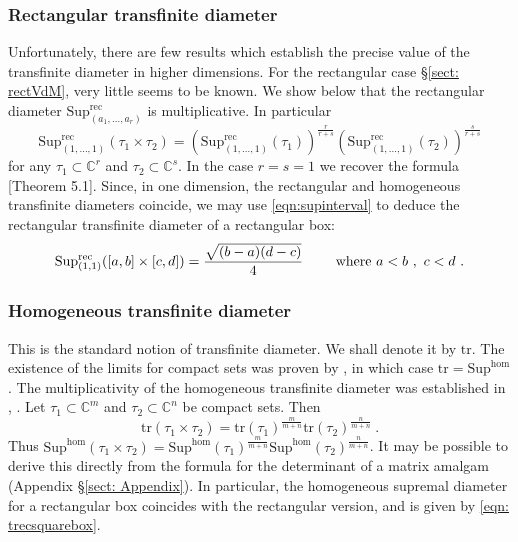 \documentclass[a4paper,10pt]{amsart}
\theoremstyle{definition}
\theoremstyle{remark}
\numberwithin{equation}{section}
\newcommand{\C}{\mathbb C}
\newcommand{\rec}{\mathrm{rec}}
\newcommand{\ts}{\mathrm{Sup}}
\newcommand{\tr}{\mathrm{tr}}
\newcommand{\0}{\color{blue}{\mathsf{0}}}
\begin{document}
  \subsubsection{Rectangular transfinite diameter}
   Unfortunately, there are few results which establish the precise value of the transfinite diameter in higher dimensions.  For the rectangular case \S\ref{sect: rectVdM}, very little seems to be known. We show below that the rectangular diameter $\ts^{\rec}_{(a_1,\ldots,a_r)}$  is multiplicative. In particular  
   \[ \ts^{\rec}_{(1,\ldots,1)} (\tau_1 \times \tau_2) =    \left(\ts^{\rec}_{(1,\ldots,1)} (\tau_1 )\right)^{\frac{r}{r+s}}  \left(  \ts^{\rec}_{(1,\ldots,1)} ( \tau_2) \right)^{\frac{s}{r+s}}   \]
   for any $\tau_1 \subset \C^r$ and $\tau_2 \subset \C^s$.
   In the case $r=s=1$ we recover the formula  \cite{LevenbergWielonsky}[Theorem 5.1].    
   Since, in one dimension, the rectangular and homogeneous transfinite diameters coincide,  we may use \eqref{eqn:supinterval} to deduce the rectangular transfinite diameter of a rectangular box:
   \begin{equation} \label{eqn: trecsquarebox}  \ts^{\rec}_{(1,1)} (  [a,b]\times [c,d]) =  \frac{\sqrt{(b-a)(d-c)}}{4} \qquad \hbox{ where }  a<b \ , \ c<d \ .
   \end{equation}
   
  \subsubsection{Homogeneous transfinite diameter} This is the standard notion of transfinite diameter. We shall denote it by $\tr$.
  The existence of the limits for compact sets was proven by \cite{Zaharjuta}, in which case $\tr = \ts^{\hom}$. 
The  multiplicativity  of the homogeneous transfinite diameter was established in \cite{SchifferSiciak}, \cite[Theorem 1]{BloomCalvi}. Let $\tau_1 \subset \C^{m}$ and $\tau_2 \subset \C^{n}$ be compact sets. Then
  \begin{equation} \label{homogeneoustransfinitemultiplicative}
  \tr(\tau_1 \times \tau_2)  =  \tr(\tau_1)^{\frac{m}{m+n}}  \tr(\tau_2)^{\frac{n}{m+n}}   \ . 
  \end{equation} 
 Thus $\ts^{\hom}(\tau_1 \times \tau_2) =    \ts^{\hom}(\tau_1)^{\frac{m}{m+n}} \ts^{\hom}(\tau_2)^{\frac{n}{m+n}} $.   It may be possible to derive this  directly from the formula for the determinant of a matrix amalgam (Appendix \S\ref{sect: Appendix}).  In particular, the homogeneous supremal diameter for a rectangular box coincides with the rectangular version, and is given by \eqref{eqn: trecsquarebox}.
  
\end{document}
